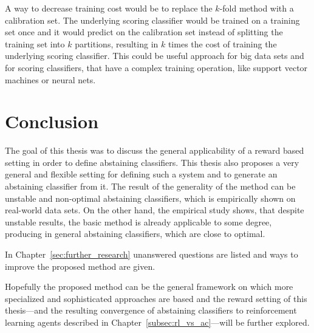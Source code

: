 \documentclass[twoside,11pt]{article}
\begin{document}
A way to decrease training cost would be to replace the
$k$-fold method with a calibration set.
The underlying scoring classifier would be trained on a
training set once and it would predict on the calibration
set instead of splitting the training set into $k$
partitions, resulting in $k$ times the cost of training
the underlying scoring classifier.
This could be useful approach for big data sets and for
scoring classifiers, that have a complex training
operation, like support vector machines or neural nets.

\section{Conclusion}

The goal of this thesis was to discuss the general
applicability of a reward based setting in order to define
abstaining classifiers.
This thesis also proposes a very general and flexible
setting for defining such a system and to generate an
abstaining classifier from it.
The result of the generality of the method can be unstable
and non-optimal abstaining classifiers, which is
empirically shown on real-world data sets.
On the other hand, the empirical study shows, that despite
unstable results, the basic method is already applicable to
some degree, producing in general abstaining classifiers,
which are close to optimal.

In Chapter~\ref{sec:further_research} unanswered questions
are listed and ways to improve the proposed method are
given.

Hopefully the proposed method can be the general framework
on which more specialized and sophisticated approaches are
based and the reward setting of this thesis---and the
resulting convergence of abstaining classifiers to
reinforcement learning agents described in
Chapter~\ref{subsec:rl_vs_ac}---will be further explored.

\newpage
\end{document}
